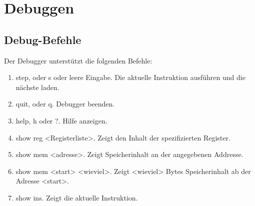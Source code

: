 \section{Debuggen}

\subsection{Debug-Befehle}

Der Debugger unterstützt die folgenden Befehle:

\begin{enumerate}
 \item step, oder s oder leere Eingabe. 
       Die aktuelle Instruktion ausführen und die nächste laden.
 \item quit, oder q. Debugger beenden.
 \item help, h oder ?. Hilfe anzeigen.
 \item show reg <Registerliste>. Zeigt den Inhalt der spezifizierten Register.
 \item show mem <adresse>. Zeigt Speicherinhalt an der angegebenen Addresse.
 \item show mem <start> <wieviel>. Zeigt <wieviel> Bytes Speicherinhalt ab
       der Adresse <start>.
 \item show ins. Zeigt die aktuelle Instruktion.
\end{enumerate}

